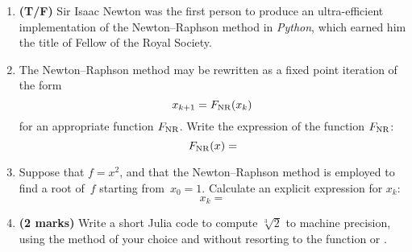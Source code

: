 \documentclass{article}
\begin{document}
\begin{enumerate}
    \item
        \textbf{(T/F)}
        Sir Isaac Newton was the first person to produce an ultra-efficient implementation of the Newton--Raphson method in \emph{Python},
        which earned him the title of Fellow of the Royal Society.

    \item
        The Newton--Raphson method may be rewritten as a fixed point iteration of the form
        \[
            x_{k+1} = F_{\rm NR}(x_k)
        \]
        for an appropriate function $F_{\rm NR}$.
        Write the expression of the function $F_{\rm NR}$:
        \[
            F_{\rm NR} (x) =
        \]

    \item
        Suppose that $f = x^2$, 
        and that the Newton--Raphson method is employed to find a root of~$f$ starting from~$x_0 = 1$.
        Calculate an explicit expression for $x_k$:
        \[
            x_k = 
        \]

    \item
        \textbf{(2 marks)}
        Write a short Julia code to compute $\sqrt[3]{2}$ to machine precision,
        using the method of your choice and without resorting to the function  or .
\end{enumerate}
\end{document}
